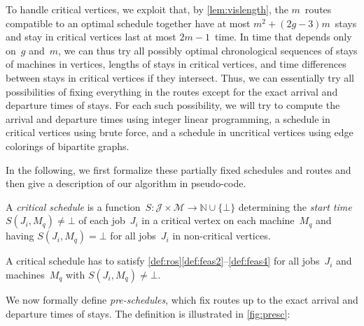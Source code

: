 \documentclass[natbib,sort,smallextended,envcountsame,envcountsect,numbook]{svjour3}
\newcommand{\sched}{S}
\newcommand{\Js}{\mathcal J}
\newcommand{\Ms}{\mathcal M}
\def\totstays{\ensuremath{{m^2+(2g-3)m}}}
\begin{document}
\noindent
To handle critical vertices,
we exploit that,
by \cref{lem:vislength},
the \(m\)~routes compatible to an optimal schedule
together have at most \(\totstays\)~stays
and stay in critical vertices last at most \(2m-1\)~time.
In time that depends only on~\(g\) and~\(m\), 
we can thus try all possibly optimal chronological sequences
of stays of machines in vertices,
lengths of stays in critical vertices,
and time differences between stays in critical vertices
if they intersect.
Thus, we can essentially try all possibilities of fixing
everything in the routes
except for the exact arrival and departure times of stays.
For each such possibility,
we will try to compute the arrival and departure times
using integer linear programming,
a schedule in critical vertices using brute force,
and a schedule in uncritical vertices using edge colorings of bipartite graphs.

In the following, we first formalize
these partially fixed schedules and routes
and then give a description of our algorithm in pseudo-code.

\begin{definition}
  A \emph{critical schedule} is a
  function~$\sched\colon \Js{}\times\Ms{}\to\mathbb N\cup\{\bot\}$
  determining the \emph{start time}~$\sched(J_i, M_q)\ne\bot$
  of each job~$J_i$ in a critical vertex on each machine~$M_q$
  and having \(S(J_i,M_q)=\bot\) for all jobs~\(J_i\) in non-critical vertices.

  A critical schedule has to satisfy \cref{def:ros}\eqref{def:feas2}--\eqref{def:feas4}
  for all jobs~\(J_i\) and machines~\(M_q\) with \(S(J_i,M_q)\ne\bot\).
\end{definition}

\noindent
We now formally define \emph{pre-schedules},
which fix routes up to the exact arrival and departure times of stays.
The definition is illustrated in \cref{fig:presc}:
\end{document}
